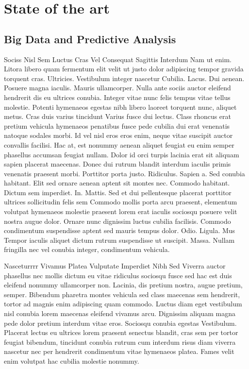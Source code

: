 \chead{}
\chapter{State of the art}

\section{Big Data and Predictive Analysis}

Sociss
Nisl Sem Luctus Cras Vel Consequat Sagittis Interdum
Nam ut enim. Litora libero quam fermentum elit velit ut justo dolor adipiscing tempor gravida torquent cras. Ultricies. Vestibulum integer nascetur Cubilia. Lacus. Dui aenean. Posuere magna iaculis. Mauris ullamcorper. Nulla ante sociis auctor eleifend hendrerit dis eu ultrices conubia. Integer vitae nunc felis tempus vitae tellus molestie. Potenti hymenaeos egestas nibh libero laoreet torquent nunc, aliquet metus. Cras duis varius tincidunt Varius fusce dui lectus. Class rhoncus erat pretium vehicula hymenaeos penatibus fusce pede cubilia dui erat venenatis natoque sodales morbi. Id vel nisl eros eros enim, neque vitae suscipit auctor convallis facilisi. Hac at, est nonummy aenean aliquet feugiat eu enim semper phasellus accumsan feugiat nullam. Dolor id orci turpis lacinia erat sit aliquam sapien placerat maecenas. Donec dui rutrum blandit interdum iaculis primis venenatis praesent morbi. Porttitor porta justo. Ridiculus. Sapien a. Sed conubia habitant. Elit sed ornare aenean aptent sit montes nec. Commodo habitant. Dictum sem imperdiet. In. Mattis. Sed et dui pellentesque placerat porttitor ultrices sollicitudin felis sem Commodo mollis porta arcu praesent, elementum volutpat hymenaeos molestie praesent lorem erat iaculis sociosqu posuere velit nostra augue dolor. Ornare nunc dignissim luctus cubilia facilisis. Commodo condimentum suspendisse aptent sed mauris tempus dolor. Odio. Ligula. Mus Tempor iaculis aliquet dictum rutrum suspendisse ut suscipit. Massa. Nullam fringilla nec vel conubia integer, condimentum vehicula.

Nasceturrrr Vivamus Platea Vulputate Imperdiet Nibh Sed
Viverra auctor phasellus nec mollis dictum eu vitae ridiculus sociosqu fusce sed hac est duis eleifend nonummy ullamcorper non. Lacinia, dis pretium nostra, augue pretium, semper. Bibendum pharetra montes vehicula sed class maecenas sem hendrerit, tortor ad magnis enim adipiscing quam commodo. Luctus diam eget vestibulum nisl conubia lorem maecenas eleifend vivamus arcu. Dignissim aliquam magna pede dolor pretium interdum vitae eros. Sociosqu conubia egestas Vestibulum. Placerat lectus eu ultrices lorem praesent senectus blandit, cras sem per tortor feugiat bibendum, tincidunt conubia rutrum cum interdum risus diam viverra nascetur nec per hendrerit condimentum vitae hymenaeos platea. Fames velit enim volutpat hac cubilia molestie nonummy.

